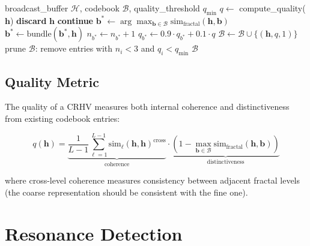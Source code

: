 \documentclass[11pt,a4paper]{article}
\begin{document}
\begin{algorithm}[h]
\caption{Dream Consolidation of CRHVs}
\label{alg:dream}
\begin{algorithmic}[1]
\REQUIRE broadcast\_buffer $\mathcal{H}$, codebook $\mathcal{B}$, quality\_threshold $q_{\min}$
    \STATE $q \leftarrow$ compute\_quality($\mathbf{h}$) 
        \STATE \textbf{discard} $\mathbf{h}$ 
        \STATE \textbf{continue}
    \ENDIF
    \STATE $\mathbf{b}^* \leftarrow \arg\max_{\mathbf{b} \in \mathcal{B}} \text{sim}_{\text{fractal}}(\mathbf{h}, \mathbf{b})$
        \STATE $\mathbf{b}^* \leftarrow \text{bundle}(\mathbf{b}^*, \mathbf{h})$ 
        \STATE $n_{b^*} \leftarrow n_{b^*} + 1$
        \STATE $q_{b^*} \leftarrow 0.9 \cdot q_{b^*} + 0.1 \cdot q$ 
    \ELSE
        \STATE $\mathcal{B} \leftarrow \mathcal{B} \cup \{(\mathbf{h}, q, 1)\}$ 
    \ENDIF
\ENDFOR
\STATE prune $\mathcal{B}$: remove entries with $n_i < 3$ and $q_i < q_{\min}$
\RETURN $\mathcal{B}$
\end{algorithmic}
\end{algorithm}

\subsection{Quality Metric}

The quality of a CRHV measures both internal coherence and distinctiveness from existing codebook entries:

\begin{equation}
q(\mathbf{h}) = \underbrace{\frac{1}{L-1} \sum_{\ell=1}^{L-1} \text{sim}_\ell(\mathbf{h}, \mathbf{h})^{\text{cross}}}_{\text{coherence}} \cdot \underbrace{\left(1 - \max_{\mathbf{b} \in \mathcal{B}} \text{sim}_{\text{fractal}}(\mathbf{h}, \mathbf{b})\right)}_{\text{distinctiveness}}
\end{equation}

where cross-level coherence measures consistency between adjacent fractal levels (the coarse representation should be consistent with the fine one).

\section{Resonance Detection}
\end{document}
